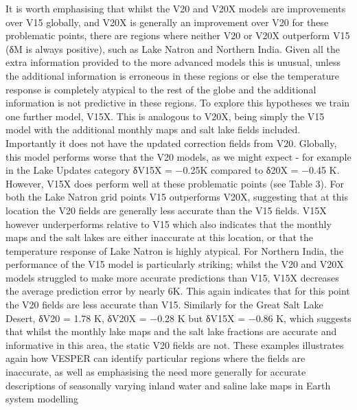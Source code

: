 \documentclass[hess, manuscript]{copernicus}
\begin{document}
It is worth emphasising that whilst the V20 and V20X models are improvements over V15 globally, and V20X is generally an improvement over V20 for these problematic points, there are regions where neither V20 or V20X outperform V15 (δM is always positive), such as Lake Natron and Northern India. Given all the extra information provided to the more advanced models this is unusual, unless the additional information is erroneous in these regions or else the temperature response is completely atypical to the rest of the globe and the additional information is not predictive in these regions. To explore this hypotheses we train one further model, V15X. This is analogous to V20X, being simply the V15 model with the additional monthly maps and salt lake fields included. Importantly it does not have the updated correction fields from V20. Globally, this model performs worse that the V20 models, as we might expect - for example in the Lake Updates category δV15X = −0.25K compared to δ20X = −0.45 K. However, V15X does perform well at these problematic points (see Table 3). For both the Lake Natron grid points V15 outperforms V20X, suggesting that at this location the V20 fields are generally less accurate than the V15 fields. V15X however underperforms relative to V15 which also indicates that the monthly maps and the salt lakes are either inaccurate at this location, or that the temperature response of Lake Natron is highly atypical. For Northern India, the performance of the V15 model is particularly striking; whilst the V20 and V20X models struggled to make more accurate predictions than V15, V15X decreases the average prediction error by nearly 6K. This again indicates that for this point the V20 fields are less accurate than V15. Similarly for the Great Salt Lake Desert, δV20 = 1.78 K, δV20X = −0.28 K but δV15X = −0.86 K, which suggests that whilst the monthly lake maps and the salt lake fractions are accurate and informative in this area, the static V20 fields are not. These examples illustrates again how VESPER can identify particular regions where the fields are inaccurate, as well as emphasising the need more generally for accurate descriptions of seasonally varying inland water and saline lake maps in Earth system modelling
\end{document}
